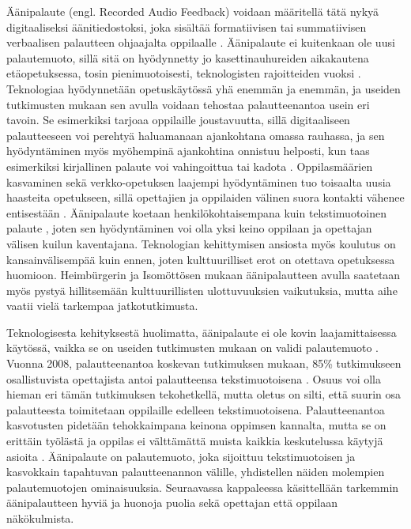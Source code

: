 \documentclass[utf8]{gradu3}
\begin{document}
Äänipalaute (engl. Recorded Audio Feedback) voidaan määritellä tätä nykyä digitaaliseksi äänitiedostoksi, joka sisältää formatiivisen tai summatiivisen verbaalisen palautteen ohjaajalta oppilaalle \parencite[][]{developing}. Äänipalaute ei kuitenkaan ole uusi palautemuoto, sillä sitä on hyödynnetty jo kasettinauhureiden aikakautena etäopetuksessa, tosin pienimuotoisesti, teknologisten rajoitteiden vuoksi \parencite[][]{developing}. Teknologiaa hyödynnetään opetuskäytössä yhä enemmän ja enemmän, ja useiden tutkimusten mukaan sen avulla voidaan tehostaa palautteenantoa usein eri tavoin. Se esimerkiksi tarjoaa oppilaille joustavuutta, sillä digitaaliseen palautteeseen voi perehtyä haluamanaan ajankohtana omassa rauhassa, ja sen hyödyntäminen myös myöhempinä ajankohtina onnistuu helposti, kun taas esimerkiksi kirjallinen palaute voi vahingoittua tai kadota \parencite[][]{technology}. Oppilasmäärien kasvaminen sekä verkko-opetuksen laajempi hyödyntäminen tuo toisaalta uusia haasteita opetukseen, sillä opettajien ja oppilaiden välinen suora kontakti vähenee entisestään \parencite[][]{engaging}. Äänipalaute koetaan henkilökohtaisempana kuin tekstimuotoinen palaute \parencite[][]{evaluating}, joten sen hyödyntäminen voi olla yksi keino oppilaan ja opettajan välisen kuilun kaventajana. Teknologian kehittymisen ansiosta myös koulutus on kansainvälisempää kuin ennen, joten kulttuurilliset erot on otettava opetuksessa huomioon. Heimbürgerin ja Isomöttösen \parencite[][]{moderating} mukaan äänipalautteen avulla saatetaan myös pystyä hillitsemään kulttuurillisten ulottuvuuksien vaikutuksia, mutta aihe vaatii vielä tarkempaa jatkotutkimusta.

Teknologisesta kehityksestä huolimatta, äänipalaute  ei ole kovin laajamittaisessa käytössä, vaikka se on useiden tutkimusten mukaan on validi palautemuoto \parencite[][]{engaging}. Vuonna 2008, palautteenantoa koskevan tutkimuksen mukaan, 85\% tutkimukseen osallistuvista opettajista antoi palautteensa tekstimuotoisena \parencite[][]{electronic}. Osuus voi olla hieman eri tämän tutkimuksen tekohetkellä, mutta oletus on silti, että suurin osa palautteesta toimitetaan oppilaille edelleen tekstimuotoisena. Palautteenantoa kasvotusten pidetään tehokkaimpana keinona oppimsen kannalta, mutta se on erittäin työlästä ja oppilas ei välttämättä muista kaikkia keskutelussa käytyjä asioita \parencite[][]{modes}. Äänipalaute on palautemuoto, joka sijoittuu tekstimuotoisen ja kasvokkain tapahtuvan palautteenannon välille, yhdistellen näiden molempien palautemuotojen ominaisuuksia. Seuraavassa kappaleessa käsittellään tarkemmin äänipalautteen hyviä ja huonoja puolia sekä opettajan että oppilaan näkökulmista.
\end{document}
